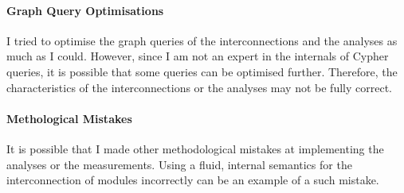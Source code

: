 \paragraph{Graph Query Optimisations}
I tried to optimise the graph queries of the interconnections and the analyses as much as I could. However, since I am not an expert in the internals of Cypher queries, it is possible that some queries can be optimised further. Therefore, the characteristics of the interconnections or the analyses may not be fully correct.


\paragraph{Methological Mistakes}
It is possible that I made other methodological mistakes at implementing the analyses or the measurements. Using a fluid, internal semantics for the interconnection of modules incorrectly can be an example of a such mistake.